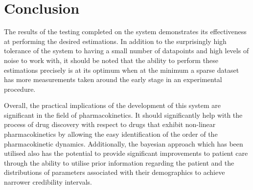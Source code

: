 \section{Conclusion}

The results of the testing completed on the system demonstrates its effectiveness at performing the desired estimations. In addition to the surprisingly high tolerance of the system to having a small number of datapoints and high levels of noise to work with, it should be noted that the ability to perform these estimations precisely is at its optimum when at the minimum a sparse dataset has more measurements taken around the early stage in an experimental procedure.

Overall, the practical implications of the development of this system are significant in the field of pharmacokinetics. It should significantly help with the process of drug discovery with respect to drugs that exhibit non-linear pharmacokinetics by allowing the easy identification of the order of the pharmacokinetic dynamics. Additionally, the bayesian approach which has been utilised also has the potential to provide significant improvements to patient care through the ability to utilise prior information regarding the patient and the distributions of parameters associated with their demographics to achieve narrower credibility intervals.